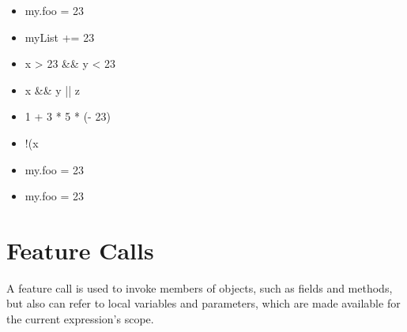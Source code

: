 \documentclass[a4paper,10pt]{scrreprt}
\newlength{\itemindentlen}
\begin{document}
\setlength{\itemindentlen}{\textwidth}
\begin{itemize}
\addtolength{\itemindentlen}{-2em}

\item \begin{minipage}[t]{\itemindentlen}
my.foo = 23
\end{minipage}

\item \begin{minipage}[t]{\itemindentlen}
myList += 23
\end{minipage}

\item \begin{minipage}[t]{\itemindentlen}
x > 23 \&\& y < 23
\end{minipage}

\item \begin{minipage}[t]{\itemindentlen}
x \&\& y || z
\end{minipage}

\item \begin{minipage}[t]{\itemindentlen}
1 + 3 * 5 * (- 23)
\end{minipage}

\item \begin{minipage}[t]{\itemindentlen}
!(x
\end{minipage}

\item \begin{minipage}[t]{\itemindentlen}
my.foo = 23
\end{minipage}

\item \begin{minipage}[t]{\itemindentlen}
my.foo = 23
\end{minipage}

\end{itemize}
\addtolength{\itemindentlen}{2em}







\section{Feature Calls\label{FeatureCalls}}
A feature call is used to invoke members of objects, such as fields and methods, but also can refer to local variables and parameters, which are made available for the current expression's scope.
\end{document}
